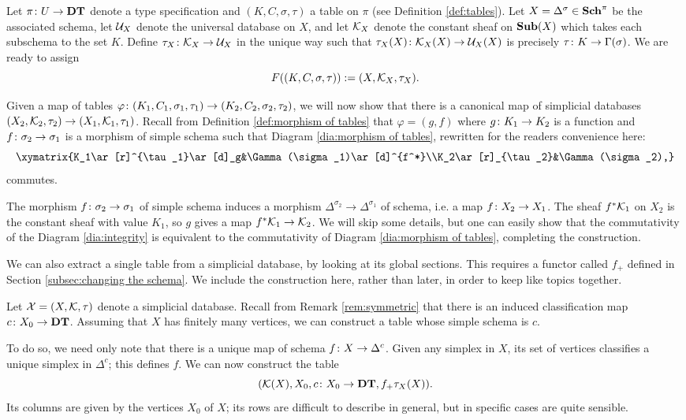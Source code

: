 \documentclass{amsart}
\def\DT{{\bf DT}}
\def\Sch{{\bf Sch}}
\def\Sub{{\bf Sub}}
\begin{document}
\begin{construction}\label{con:table as database}

Let $\pi\taking U\to\DT$ denote a type specification and $(K,C,\sigma,\tau)$ a table on $\pi$ (see Definition \ref{def:tables}).  Let $X=\Delta^\sigma\in\Sch^\pi$ be the associated schema, let $\mathcal{U}_X$ denote the universal database on $X$, and let $\mathcal{K}_X$ denote the constant sheaf on $\Sub(X)$ which takes each subschema to the set $K$.  Define $\tau_X\colon\mathcal{K}_X\rightarrow\mathcal{U}_X$ in the unique way such that $\tau_X(X)\colon\mathcal{K}_X(X)\rightarrow\mathcal{U}_X(X)$ is precisely $\tau\colon K\rightarrow\Gamma(\sigma)$.  We are ready to assign $$F((K,C,\sigma,\tau)):=(X,\mathcal{K}_X,\tau_X).$$

Given a map of tables $\varphi\colon(K_1,C_1,\sigma_1,\tau_1)\rightarrow(K_2,C_2,\sigma_2,\tau_2)$, we will now show that there is a canonical map of simplicial databases $(X_2,\mathcal{K}_2,\tau_2)\rightarrow(X_1,\mathcal{K}_1,\tau_1)$.  Recall from Definition \ref{def:morphism of tables} that $\varphi=(g,f)$ where $g\colon K_1\rightarrow K_2$ is a function and $f\colon\sigma_2\rightarrow\sigma_1$ is a morphism of simple schema such that Diagram \ref{dia:morphism of tables}, rewritten for the readers convenience here: $$\xymatrix{K_1\ar[r]^{\tau_1}\ar[d]_g&\Gamma(\sigma_1)\ar[d]^{f^*}\\K_2\ar[r]_{\tau_2}&\Gamma(\sigma_2),}$$ commutes.

The morphism $f\colon\sigma_2\rightarrow\sigma_1$ of simple schema induces a morphism $\Delta^{\sigma_2}\to\Delta^{\sigma_1}$ of schema, i.e. a map $f\colon X_2\rightarrow X_1$.  The sheaf $f^*\mathcal{K}_1$ on $X_2$ is the constant sheaf with value $K_1$, so $g$ gives a map $f^*\mathcal{K}_1\rightarrow\mathcal{K}_2$.  We will skip some details, but one can easily show that the commutativity of the Diagram \ref{dia:integrity} is equivalent to the commutativity of Diagram \ref{dia:morphism of tables}, completing the construction.

\end{construction}

We can also extract a single table from a simplicial database, by looking at its global sections.  This requires a functor called $f_+$ defined in Section \ref{subsec:changing the schema}.  We include the construction here, rather than later, in order to keep like topics together.

\begin{construction}\label{con:database as table}

Let $\mathcal{X}=(X,\mathcal{K},\tau)$ denote a simplicial database.  Recall from Remark \ref{rem:symmetric} that there is an induced classification map $c\taking X_0\to\DT$.  Assuming that $X$ has finitely many vertices, we can construct a table whose simple schema is $c$.  

To do so, we need only note that there is a unique map of schema $f\colon X\rightarrow\Delta^c$.  Given any simplex in $X$, its set of vertices classifies a unique simplex in $\Delta^c$; this defines $f$.  We can now construct the table $$(\mcK(X),X_0,c\taking X_0\to\DT,f_+\tau_X(X)).$$  Its columns are given by the vertices $X_0$ of $X$; its rows are difficult to describe in general, but in specific cases are quite sensible.

\end{construction}
\end{document}
